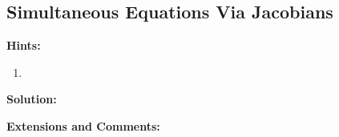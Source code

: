 \subsection{Simultaneous Equations Via Jacobians}

\textbf{Hints:}

\begin{enumerate}
    \item 
\end{enumerate}

\textbf{Solution:}



\textbf{Extensions and Comments:}